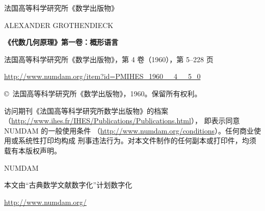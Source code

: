 \documentclass[UTF8,fontset=none,11pt,oneside,openany]{ctexbook}
\begin{document}
\begin{titlepage}
\thispagestyle{empty}
\begin{center}
{\Large 法国高等科学研究所《数学出版物》\par}
\end{center}

\vspace*{7em}

{\large ALEXANDER GROTHENDIECK\par}
\medskip
{\bfseries 《代数几何原理》第一卷：概形语言\par}
\medskip
法国高等科学研究所《数学出版物》，第 4 卷（1960），第 5--228 页

\medskip
\url{http://www.numdam.org/item?id=PMIHES_1960__4__5_0}

\vfill

\begin{minipage}{0.76\textwidth}
\small
\copyright\ 法国高等科学研究所《数学出版物》，1960。保留所有权利。

访问期刊《法国高等科学研究所数学出版物》的档案
（\url{http://www.ihes.fr/IHES/Publications/Publications.html}），
即表示同意 NUMDAM 的一般使用条件
（\url{http://www.numdam.org/conditions}）。任何商业使用或系统性打印均构成
刑事违法行为。对本文件制作的任何副本或打印件，均须载有本版权声明。
\end{minipage}

\vfill

{\large NUMDAM\par}
\smallskip
本文由“古典数学文献数字化”计划数字化

\smallskip
\url{http://www.numdam.org/}
\end{titlepage}
\clearpage
\end{document}

